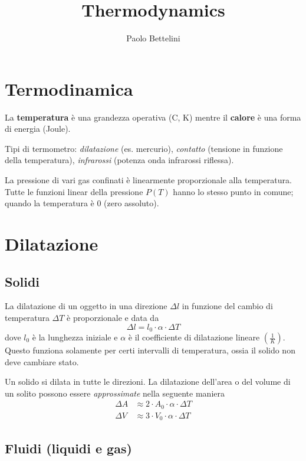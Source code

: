 \documentclass[a4paper]{article}
\title{Thermodynamics}
\author{Paolo Bettelini}
\date{}
\newcommand{\cel}{C\degree}
\begin{document}
\maketitle
\tableofcontents
\pagebreak


\section{Termodinamica}

La \textbf{temperatura} è una grandezza operativa (\cel, K)
mentre il \textbf{calore} è una forma di energia (Joule).

Tipi di termometro: \textit{dilatazione} (es. mercurio),
\textit{contatto} (tensione in funzione della temperatura),
\textit{infrarossi} (potenza onda infrarossi riflessa).

La pressione di vari gas confinati è linearmente proporzionale alla temperatura.
Tutte le funzioni linear della pressione \(P(T)\) hanno lo stesso punto in comune;
quando la temperatura è \(0\) (zero assoluto).

\section{Dilatazione}

\subsection{Solidi}

La dilatazione di un oggetto in una direzione \(\Delta l\) in funzione del
cambio di temperatura \(\Delta T\) è proporzionale e data da
\[
    \Delta l = l_0 \cdot \alpha \cdot \Delta T
\]
dove \(l_0\) è la lunghezza iniziale e \(\alpha\) è il coefficiente di dilatazione lineare
\((\frac{1}{K})\). Questo funziona solamente per certi intervalli di temperatura,
ossia il solido non deve cambiare stato.

Un solido si dilata in tutte le direzioni.
La dilatazione dell'area o del volume di un solito possono essere \textit{approssimate}
nella seguente maniera
\begin{align*}
    \Delta A &\approx 2 \cdot A_0 \cdot \alpha \cdot \Delta T \\
    \Delta V &\approx 3 \cdot V_0 \cdot \alpha \cdot \Delta T
\end{align*}

\subsection{Fluidi (liquidi e gas)}
\end{document}
